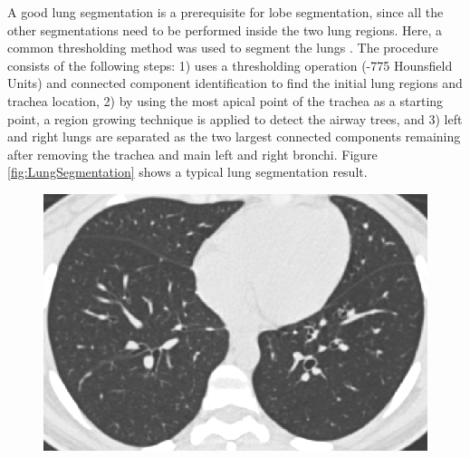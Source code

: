 \documentclass[]{spie}  %
\begin{document}
A good lung segmentation is a prerequisite for lobe segmentation, since all the other segmentations need to be performed inside the two lung regions. Here, a common thresholding method was used to segment the lungs \cite{ukil2005smoothing}. The procedure consists of the following steps: 1) uses a thresholding operation (-775 Hounsfield Units) and connected component identification to find the initial lung regions and trachea location, 2) by using the most apical point of the trachea as a starting point, a region growing technique is applied to detect the airway trees, and 3) left and right lungs are separated as the two largest connected components remaining after removing the trachea and main left and right bronchi. Figure \ref{fig:LungSegmentation} shows a typical lung segmentation result.

\begin{figure}[htbp] 
\centering
\begin{subfigure}{
  \begin{minipage}[t]{0.3\linewidth}
  \includegraphics[width=\linewidth,trim={{.0\wd0} {.0\wd0} {.0\wd0} {.0\wd0}},clip]{Image/LungSegmentationBefore.png}

\end{minipage}}
\end{subfigure}
\end{figure}
\end{document}
